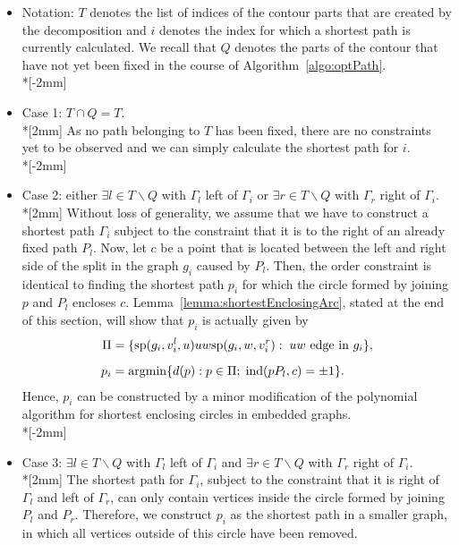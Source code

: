 \documentclass[reqno]{amsart}
\let\join\relax
\DeclareMathOperator*{\argmin}{argmin}
\DeclareMathOperator{\join}{\dot{+}}
\DeclareMathOperator{\ind}{ind}
\begin{document}
\begin{itemize}
\item Notation: $T$ denotes the list of indices of the contour parts that are created by the decomposition and $i$ denotes the index for which a shortest path is currently calculated. We recall that $Q$ denotes the
parts of the contour that have not yet been fixed in the course of Algorithm~\ref{algo:optPath}.\\*[-2mm]
	\item Case 1: $T \cap Q = T$. \\*[2mm]
	As no path belonging to $T$ has been fixed, there are no constraints yet to be observed and we can simply calculate the shortest path for $i$.\\*[-2mm]

	\item Case 2: either $\exists l \in T \backslash Q$ with $\Gamma_l$ left of $\Gamma_i$ or $\exists r \in T \backslash Q$ with $\Gamma_r$ right of $\Gamma_i$.\\*[2mm]  
	Without loss of generality, we assume that we have to construct a shortest path $\Gamma_i$ subject to the constraint that it is to the right of an already fixed path $P_l$. Now, let $c$ be a point that is located between the left and right side of the split in the graph $g_i$ caused by $P_l$. Then, the order constraint is identical to finding the shortest path $p_i$ for which the circle formed by joining $p$ and $P_l$ encloses $c$. 
Lemma~\ref{lemma:shortestEnclosingArc}, stated at the end of this section, will show that $p_i$ is actually given by
	\begin{align*}	
		\Pi &= \{\text{sp}(g_i, v_i^l, u) \join uw \join \text{sp}(g_i, w, v_i^r):\; uw \text{ edge in $g_i$} \},\\*[2mm]
		p_i &= \argmin \{ d(p) : p \in \Pi;\; \ind(p \join P_l,c)= \pm 1 \}.
	\end{align*}
	Hence, $p_i$ can be constructed by a minor modification of the polynomial algorithm \cite{provan89} for shortest enclosing circles 
    in embedded graphs.\\*[-2mm]
	
	\item Case 3: $\exists l \in T \backslash Q$ with $\Gamma_l$ left of $\Gamma_i$ and $\exists r \in T \backslash Q$ with $\Gamma_r$ right of $\Gamma_i$.\\*[2mm]
	The shortest path for $\Gamma_i$, subject to the constraint that it is right of $\Gamma_l$ and left of $\Gamma_r$, can only contain vertices inside the circle formed by joining $P_l$ and $P_r$. Therefore, we construct $p_i$ as 
	the shortest path in a smaller graph, in which all vertices outside of this circle have been removed.
	
\end{itemize}
\end{document}
